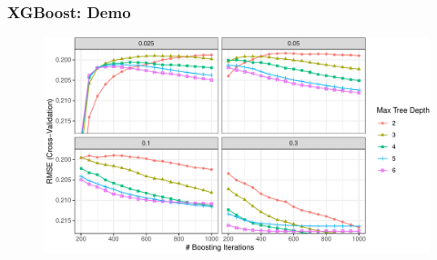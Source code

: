 \documentclass[
  shownotes,
  xcolor={svgnames},
  hyperref={colorlinks,citecolor=DarkBlue,linkcolor=DarkRed,urlcolor=DarkBlue}
  , aspectratio=169]{beamer}
\begin{document}
\begin{frame}[fragile]
\frametitle{XGBoost: Demo}



  \begin{figure}[H] \centering
            \captionsetup{justification=centering}
              \includegraphics[scale=0.6]{figures/unnamed-chunk-4-1.pdf}
              
 \end{figure}

\end{frame}
\end{document}
